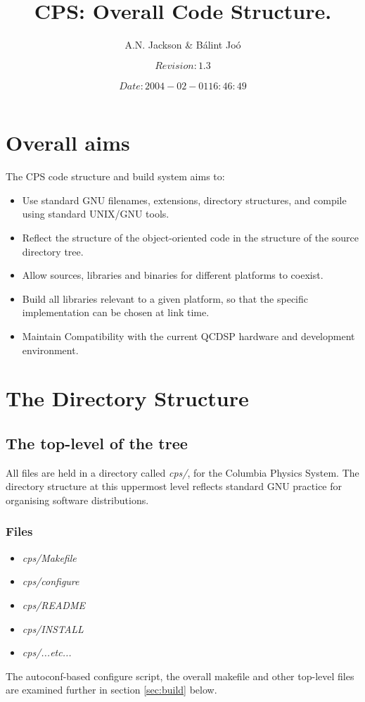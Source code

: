 \documentclass[12pt]{article}
\title{CPS: Overall Code Structure.}
\author{A.N. Jackson \& B\'{a}lint Jo\'{o}}
\date{\mbox{\small $$Revision: 1.3 $$  $$Date: 2004-02-01 16:46:49 $$}}
\begin{document}
\maketitle

\tableofcontents
\newpage

\section{Overall aims}
The CPS code structure and build system aims to:
\begin{itemize}
\setlength{\itemsep}{0.0cm}
 \item Use standard GNU filenames, extensions, directory structures, and
 compile using standard UNIX/GNU tools.
 \item Reflect the structure of the object-oriented code in the structure of
 the source directory tree.
 \item Allow sources, libraries and binaries for different platforms to coexist.
 \item Build all libraries relevant to a given platform, so that the specific
 implementation can be chosen at link time.
\item Maintain Compatibility with the current QCDSP hardware and development environment.
\end{itemize}

\section{The Directory Structure}
\label{sec:dirs}

\subsection{The top-level of the tree}
All files are held in a directory called \emph{cps/}, for the Columbia Physics System.
The directory structure at this uppermost level reflects standard GNU practice
for organising software distributions.

\subsubsection{Files}
\begin{itemize}
\setlength{\itemsep}{0.0cm}
 \item \emph{cps/Makefile}
 \item \emph{cps/configure}
 \item \emph{cps/README}
 \item \emph{cps/INSTALL}
 \item \emph{cps/...etc...}
\end{itemize}
The autoconf-based configure script, the overall makefile and other top-level 
files are examined further in section \ref{sec:build} below.
\end{document}
